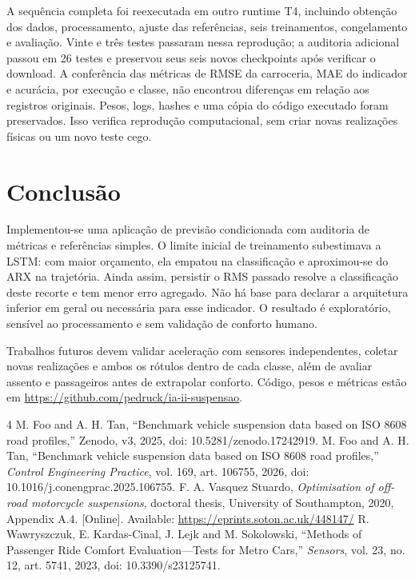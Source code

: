 \documentclass[conference]{IEEEtran}
\begin{document}
A sequência completa foi reexecutada em outro runtime T4, incluindo obtenção dos dados, processamento, ajuste das referências, seis treinamentos, congelamento e avaliação. Vinte e três testes passaram nessa reprodução; a auditoria adicional passou em 26 testes e preservou seus seis novos checkpoints após verificar o download. A conferência das métricas de RMSE da carroceria, MAE do indicador e acurácia, por execução e classe, não encontrou diferenças em relação aos registros originais. Pesos, logs, hashes e uma cópia do código executado foram preservados. Isso verifica reprodução computacional, sem criar novas realizações físicas ou um novo teste cego.

\section{Conclusão}
Implementou-se uma aplicação de previsão condicionada com auditoria de métricas e referências simples. O limite inicial de treinamento subestimava a LSTM: com maior orçamento, ela empatou na classificação e aproximou-se do ARX na trajetória. Ainda assim, persistir o RMS passado resolve a classificação deste recorte e tem menor erro agregado. Não há base para declarar a arquitetura inferior em geral ou necessária para esse indicador. O resultado é exploratório, sensível ao processamento e sem validação de conforto humano.

Trabalhos futuros devem validar aceleração com sensores independentes, coletar novas realizações e ambos os rótulos dentro de cada classe, além de avaliar assento e passageiros antes de extrapolar conforto. Código, pesos e métricas estão em \url{https://github.com/pedruck/ia-ii-suspensao}.

\begin{thebibliography}{4}
 M. Foo and A. H. Tan, ``Benchmark vehicle suspension data based on ISO 8608 road profiles,'' Zenodo, v3, 2025, doi: 10.5281/zenodo.17242919.
 M. Foo and A. H. Tan, ``Benchmark vehicle suspension data based on ISO 8608 road profiles,'' \emph{Control Engineering Practice}, vol. 169, art. 106755, 2026, doi: 10.1016/j.conengprac.2025.106755.
 F. A. Vasquez Stuardo, \emph{Optimisation of off-road motorcycle suspensions}, doctoral thesis, University of Southampton, 2020, Appendix A.4. [Online]. Available: \url{https://eprints.soton.ac.uk/448147/}
 R. Wawryszczuk, E. Kardas-Cinal, J. Lejk and M. Sokolowski, ``Methods of Passenger Ride Comfort Evaluation---Tests for Metro Cars,'' \emph{Sensors}, vol. 23, no. 12, art. 5741, 2023, doi: 10.3390/s23125741.
\end{thebibliography}
\end{document}
